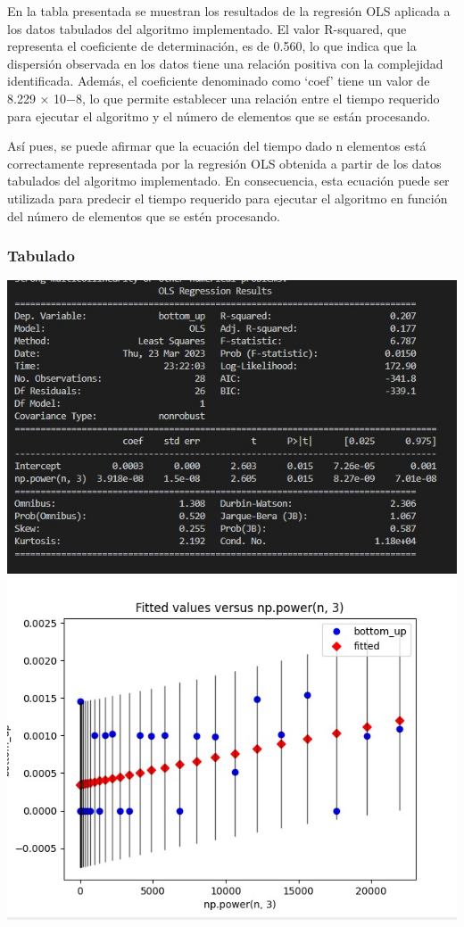 \documentclass[11pt]{article}
\begin{document}
En la tabla presentada se muestran los resultados de la regresión OLS
aplicada a los datos tabulados del algoritmo implementado. El valor
R-squared, que representa el coeficiente de determinación, es de 0.560,
lo que indica que la dispersión observada en los datos tiene una
relación positiva con la complejidad identificada. Además, el
coeficiente denominado como `coef' tiene un valor de 8.229 × 10−8, lo
que permite establecer una relación entre el tiempo requerido para
ejecutar el algoritmo y el número de elementos que se están procesando.

Así pues, se puede afirmar que la ecuación del tiempo dado n elementos
está correctamente representada por la regresión OLS obtenida a partir
de los datos tabulados del algoritmo implementado. En consecuencia, esta
ecuación puede ser utilizada para predecir el tiempo requerido para
ejecutar el algoritmo en función del número de elementos que se estén
procesando.

\hypertarget{tabulado}{%
\subsubsection{Tabulado}\label{tabulado}}

\includegraphics{OLSTABLA3.jpg} \includegraphics{OLSGRAFICO3.jpg}
\end{document}
